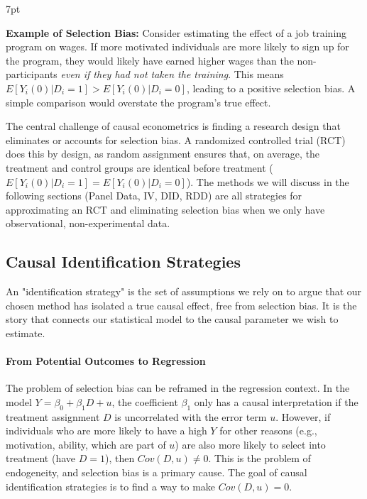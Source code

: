 \documentclass{article}
\newenvironment{redblock}{
\def\FrameCommand{
  \hspace{1pt}
    {\color{LightCoral}
    \vrule width 2pt}
    {\color{redshade}
    \vrule width 4pt}
  \colorbox{redshade}
}
\MakeFramed{
  \advance
  \hsize-
  \width
  \FrameRestore}
\noindent\hspace{-4.55pt}%
\begin{adjustwidth}{}{7pt}
\vspace{2pt}\vspace{2pt}
}
{\vspace{2pt}\end{adjustwidth}\endMakeFramed}
\begin{document}
\begin{redblock}
\textbf{Example of Selection Bias:} Consider estimating the effect of a job training program on wages. If more motivated individuals are more likely to sign up for the program, they would likely have earned higher wages than the non-participants \textit{even if they had not taken the training}. This means $E[Y_i(0)|D_i=1] > E[Y_i(0) | D_i=0]$, leading to a positive selection bias. A simple comparison would overstate the program's true effect.
\end{redblock}

The central challenge of causal econometrics is finding a research design that eliminates or accounts for selection bias. A randomized controlled trial (RCT) does this by design, as random assignment ensures that, on average, the treatment and control groups are identical before treatment ($E[Y_i(0)|D_i=1] = E[Y_i(0) | D_i=0]$). The methods we will discuss in the following sections (Panel Data, IV, DID, RDD) are all strategies for approximating an RCT and eliminating selection bias when we only have observational, non-experimental data.

\subsection{Causal Identification Strategies}
\label{sub:causal_identification}

An "identification strategy" is the set of assumptions we rely on to argue that our chosen method has isolated a true causal effect, free from selection bias. It is the story that connects our statistical model to the causal parameter we wish to estimate.

\paragraph{From Potential Outcomes to Regression}
The problem of selection bias can be reframed in the regression context. In the model $Y = \beta_0 + \beta_1 D + u$, the coefficient $\beta_1$ only has a causal interpretation if the treatment assignment $D$ is uncorrelated with the error term $u$. However, if individuals who are more likely to have a high $Y$ for other reasons (e.g., motivation, ability, which are part of $u$) are also more likely to select into treatment (have $D=1$), then $Cov(D,u) \neq 0$. This is the problem of endogeneity, and selection bias is a primary cause. The goal of causal identification strategies is to find a way to make $Cov(D,u) = 0$.
\end{document}
